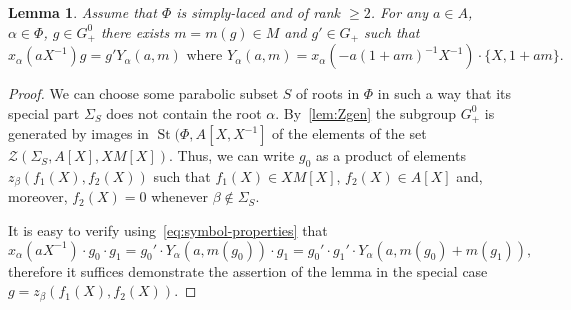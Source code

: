 \documentclass[oneside, 10pt]{amsart}
\newtheorem{lemma}{Lemma}
\theoremstyle{remark}
\theoremstyle{definition}
\DeclareMathOperator{\St}{St}
\numberwithin{equation}{section}
\begin{document}
\begin{lemma} \label{lem:lem34} Assume that $\Phi$ is simply-laced and of rank $\geq 2$.
 For any $a\in A$, $\alpha\in \Phi$, $g \in G^0_+$ there exists $m = m(g)\in M$ and $g'\in G_+$ such that 
 \[x_{\alpha}(aX^{-1}) g  = g' Y_\alpha(a,m) \text{ where } Y_\alpha(a,m) = x_\alpha(-a(1+am)^{-1}X^{-1}) \cdot \{X, 1+am\}.\]
\end{lemma}
\begin{proof}
 We can choose some parabolic subset $S$ of roots in $\Phi$ in such a way that its special part $\Sigma_S$ does not contain the root $\alpha$.
 By~\cref{lem:Zgen} the subgroup $G_+^0$ is generated by images in $\St(\Phi, A[X, X^{-1}]$ of the elements of the set $\mathcal{Z}(\Sigma_S, A[X], XM[X])$.
 Thus, we can write $g_0$ as a product of elements $z_\beta(f_1(X), f_2(X))$ such that $f_1(X) \in XM[X]$, $f_2(X) \in A[X]$ and, moreover, $f_2(X) = 0$ whenever $\beta \not \in \Sigma_S$.
 
 It is easy to verify using~\eqref{eq:symbol-properties} that \[x_\alpha(aX^{-1}) \cdot g_0 \cdot g_1 = g_0' \cdot Y_\alpha(a, m(g_0)) \cdot g_1 = g_0' \cdot g_1' \cdot Y_\alpha(a, m(g_0)+m(g_1)),\] therefore it suffices demonstrate the assertion of the lemma in the special case $g = z_\beta(f_1(X), f_2(X))$.
 

\end{proof}
\end{document}
